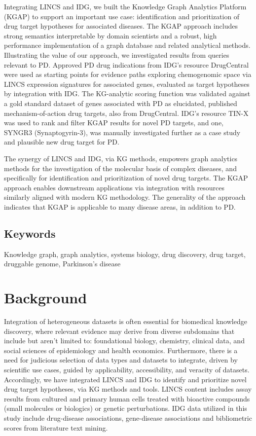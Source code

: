 Integrating LINCS and IDG, we built the Knowledge Graph Analytics Platform (KGAP) to support an important use case: identification and prioritization of drug target hypotheses for associated diseases. The KGAP approach includes strong semantics interpretable by domain scientists and a robust, high performance implementation of a graph database and related analytical methods. Illustrating the value of our approach, we investigated results from queries relevant to PD. Approved PD drug indications from IDG’s resource DrugCentral were used as starting points for evidence paths exploring chemogenomic space via LINCS expression signatures for associated genes, evaluated as target hypotheses by integration with IDG. The KG-analytic scoring function was validated against a gold standard dataset of genes associated with PD as elucidated, published mechanism-of-action drug targets, also from DrugCentral. IDG's resource TIN-X was used to rank and filter KGAP results for novel PD targets, and one, SYNGR3 (Synaptogyrin-3), was manually investigated further as a case study and plausible new drug target for PD.

The synergy of LINCS and IDG, via KG methods, empowers graph analytics methods for the investigation of the molecular basis of complex diseases, and specifically for identification and prioritization of novel drug targets. The KGAP approach enables downstream applications via integration with resources similarly aligned with modern KG methodology. The generality of the approach indicates that KGAP is applicable to many disease areas, in addition to PD.

\subsection{Keywords}
Knowledge graph, graph analytics, systems biology, drug discovery, drug target, druggable genome, Parkinson's disease

\section{Background}

Integration of heterogeneous datasets is often essential for biomedical knowledge discovery, where relevant evidence may derive from diverse subdomains that include but aren't limited to: foundational biology, chemistry, clinical data, and social sciences of epidemiology and health economics. Furthermore, there is a need for judicious selection of data types and datasets to integrate, driven by scientific use cases, guided by applicability, accessibility, and veracity of datasets. Accordingly, we have integrated LINCS and IDG to identify and prioritize novel drug target hypotheses, via KG methods and tools. LINCS content includes assay results from cultured and primary human cells treated with bioactive compounds (small molecules or biologics) or genetic perturbations. IDG data utilized in this study include drug-disease associations, gene-disease associations and bibliometric scores from literature text mining.

